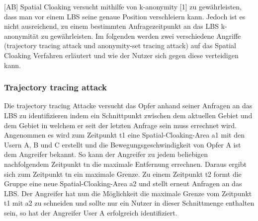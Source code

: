 [AB] Spatial Cloaking versucht mithilfe von k-anonymity [1] zu gewährleisten, dass man vor einem LBS seine genaue Position verschleiern kann. Jedoch ist es nicht ausreichend, zu einem bestimmten Anfragezeitpunkt an das LBS k-anonymität zu gewährleisten. Im folgenden werden zwei verschiedene Angriffe (trajectory tracing attack und anonymity-set tracing attack) auf das Spatial Cloaking Verfahren erläutert und wie der Nutzer sich gegen diese verteidigen kann. 
\subsubsection{Trajectory tracing attack}
Die trajectory tracing Attacke versucht das Opfer anhand seiner Anfragen an das LBS zu identifizieren indem ein Schnittpunkt zwischen dem aktuellen Gebiet und dem Gebiet in welchem er seit der letzten Anfrage sein muss errechnet wird. Angenommen es wird zum Zeitpunkt t1 eine Spatial-Cloaking-Area a1 mit den Usern A, B und C erstellt und die Bewegungsgeschwindigkeit von Opfer A ist dem Angreifer bekannt. So kann der Angreifer zu jedem beliebigen nachfolgendem Zeitpunkt tn die maximale Entfernung errechnen. Daraus ergibt sich zum Zeitpunkt tn ein maximale Grenze. Zu einem Zeitpunkt t2 formt die Gruppe eine neue Spatial-Cloaking-Area a2 und stellt erneut Anfragen an das LBS. Der Angreifer hat nun die Möglichkeit die maximale Grenze vom Zeitpunkt t1 mit a2 zu schneiden und sollte nur ein Nutzer in dieser Schnittmenge enthalten sein, so hat der Angreifer User A erfolgreich identifiziert.